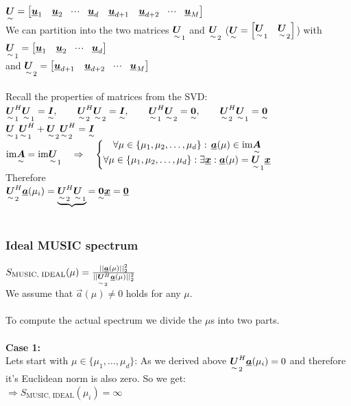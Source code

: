$\ma{U}=\mat{\vec{u}_1 & \vec{u}_2 & \shdots & \vec{u}_d & \vec{u}_{d+1} & \vec{u}_{d+2} &\shdots & \vec{u}_M}$\\
We can partition  into the two matrices $\ma{U}_1$ and $\ma{U}_2$ ($\ma{U}=\mat{\ma{U}_1 & \ma{U}_2}$) with\\
$\ma{U}_1 = \mat{\vec{u}_1 & \vec{u}_2 & \shdots & \vec{u}_d}$\\
and
$\ma{U}_2 = \mat{\vec{u}_{d+1} & \vec{u}_{d+2} &\shdots & \vec{u}_M}$\\ \\

Recall the properties of matrices from the SVD:\\
$\ma{U}^H_1\ma{U}_1=\ma{I}, \qquad \ma{U}^H_2\ma{U}_2=\ma{I}, \qquad \ma{U}^H_1\ma{U}_2=\ma{0}, \qquad \ma{U}^H_2\ma{U}_1=\ma{0}$\\
$\ma{U}_1\ma{U}^H_1 + \ma{U}_2\ma{U}^H_2 = \ma{I}$\\
$\text{im}\ma{A}= \text{im}\ma{U}_1 \pfeil
\left\lbrace \begin{matrix}
 \forall \mu\in\{\mu_1,\mu_2,\ldots,\mu_d\}:\, \vec{a}(\mu)\in\text{im}\ma{A}\\
 \forall \mu\in\{\mu_1,\mu_2,\ldots,\mu_d\}:\exists\vec{x}:\vec{a}(\mu)=\ma{U}_1\vec{x}
\end{matrix} \right.$\\
Therefore\\
$\ma{U}_2^H\vec{a}(\mu_i)=\underbrace{\ma{U}_2^H\ma{U}_1}{=\ma{0}}\vec{x}=\vec{0}$\\ \ \\

\subsubsection{Ideal MUSIC spectrum}

$S_{\text{MUSIC, IDEAL}}(\mu)=\frac{||\vec{a}(\mu)||_2^2}{||\ma{U}_2^H\vec{a}(\mu)||_2^2}$\\
We assume that $\vec{a}(\mu)\neq0$ holds for any $\mu$.\\ \\

To compute the actual spectrum we divide the $\mu$s into two parts.\\ \\

\textbf{Case 1:}\\
Lets start with $\mu\in\{\mu_1,\ldots,\mu_d\}$:
As we derived above $\ma{U}_2^H\vec{a}(\mu_i)=0$ and therefore it's Euclidean norm is also zero. So we get:\\
$\Rightarrow S_{\text{MUSIC, IDEAL}}(\mu_i)=\infty$\\

